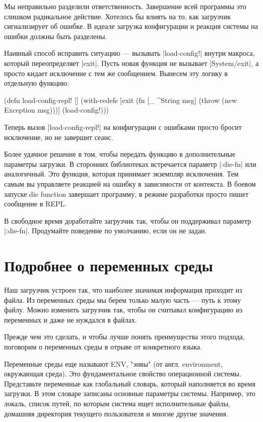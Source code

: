 Мы неправильно разделили ответственность. Завершение всей программы это слишком
радикальное действие. Хотелось бы влиять на то, как загрузчик сигнализирует об
ошибке. В идеале загрузка конфигурации и реакция системы на ошибки должны быть
разделены.

Наивный способ исправить ситуацию — вызывать \spverb|load-config!| внутри макроса,
который переопределяет \spverb|exit|. Пусть новая функция не вызывает \spverb|System/exit|, а
просто кидает исключение с тем же сообщением. Вынесем эту логику в отдельную
функцию:

\begin{code}
(defn load-config-repl!
  []
  (with-redefs
    [exit (fn [_ ^String msg]
            (throw (new Exception msg)))]
    (load-config!)))
\end{code}

Теперь вызов \spverb|load-config-repl!| на конфигурации с ошибками просто бросит
исключение, но не завершит сеанс.

Более удачное решение в том, чтобы передать функцию в дополнительные параметры
загрузки. В сторонних библиотеках встречается параметр \spverb|:die-fn| или
аналогичный. Это функция, которая принимает экземпляр исключения. Тем самым вы
управляете реакцией на ошибку в зависимости от контекста. В боевом запуске die
function завершает программу, в режиме разработки просто пишет сообщение в REPL.

В свободное время доработайте загрузчик так, чтобы он поддерживал параметр
\spverb|:die-fn|. Продумайте поведение по умолчанию, если он не задан.

\section{Подробнее о переменных среды}

Наш загрузчик устроен так, что наиболее значимая информация приходит из
файла. Из переменных среды мы берем только малую часть — путь к этому
файлу. Можно изменить загрузчик так, чтобы он считывал конфигурацию из
переменных и даже не нуждался в файлах.

Прежде чем это сделать, и чтобы лучше понять преимущества этого подхода,
поговорим о переменных среды в отрыве от конкретного языка.

Переменные среды еще называют ENV, "энвы" (от англ. environment, окружающая
среда). Это фундаментальное свойство операционной системы. Представьте
переменные как глобальный словарь, который наполняется во время загрузки. В этом
словаре записаны основные параметры системы. Например, это локаль, список путей,
по которым система ищет исполнительные файлы, домашняя директория текущего
пользователя и многие другие значения.

